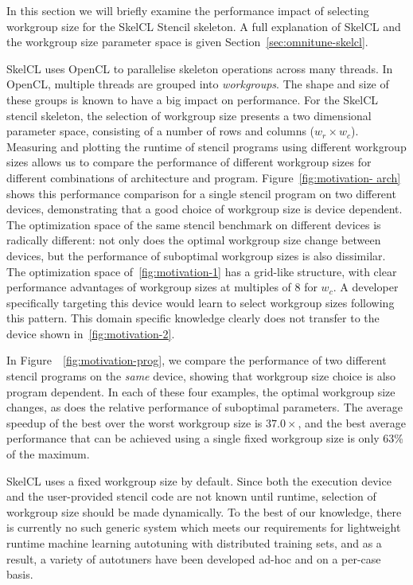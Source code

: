 \documentclass[nonatbib,preprint,nocopyrightspace,9pt]{sigplanconf}
\begin{document}
In this section we will briefly examine the performance impact of selecting
workgroup size for the SkelCL Stencil skeleton. A full explanation of SkelCL and
the workgroup size parameter space is given Section~\ref{sec:omnitune-skelcl}.

SkelCL uses OpenCL to parallelise skeleton operations across many threads. In
OpenCL, multiple threads are grouped into \emph{workgroups}. The shape and size
of these groups is known to have a big impact on performance. For the SkelCL
stencil skeleton, the selection of workgroup size presents a two dimensional
parameter space, consisting of a number of rows and columns ($w_r \times w_c$).
Measuring and plotting the runtime of stencil programs using different workgroup
sizes allows us to compare the performance of different workgroup sizes for
different combinations of architecture and program. Figure~\ref{fig:motivation-
arch} shows this performance comparison for a single stencil program on two
different devices, demonstrating that a good choice of workgroup size is device
dependent. The optimization space of the same stencil benchmark on different
devices is radically different: not only does the optimal workgroup size change
between devices, but the performance of suboptimal workgroup sizes is also
dissimilar. The optimization space of~\ref{fig:motivation-1} has a grid-like
structure, with clear performance advantages of workgroup sizes at multiples of
8 for $w_c$. A developer specifically targeting this device would learn to
select workgroup sizes following this pattern. This domain specific knowledge
clearly does not transfer to the device shown in~\ref{fig:motivation-2}.

In Figure~~\ref{fig:motivation-prog}, we compare the performance of two
different stencil programs on the \emph{same} device, showing that workgroup
size choice is also program dependent. In each of these four examples, the
optimal workgroup size changes, as does the relative performance of suboptimal
parameters. The average speedup of the best over the worst workgroup size is
$37.0\times$, and the best average performance that can be achieved using a
single fixed workgroup size is only 63\% of the maximum.

SkelCL uses a fixed workgroup size by default. Since both the execution device
and the user-provided stencil code are not known until runtime, selection of
workgroup size should be made dynamically. To the best of our knowledge, there
is currently no such generic system which meets our requirements for lightweight
runtime machine learning autotuning with distributed training sets, and as a
result, a variety of autotuners have been developed ad-hoc and on a per-case
basis.
\end{document}
